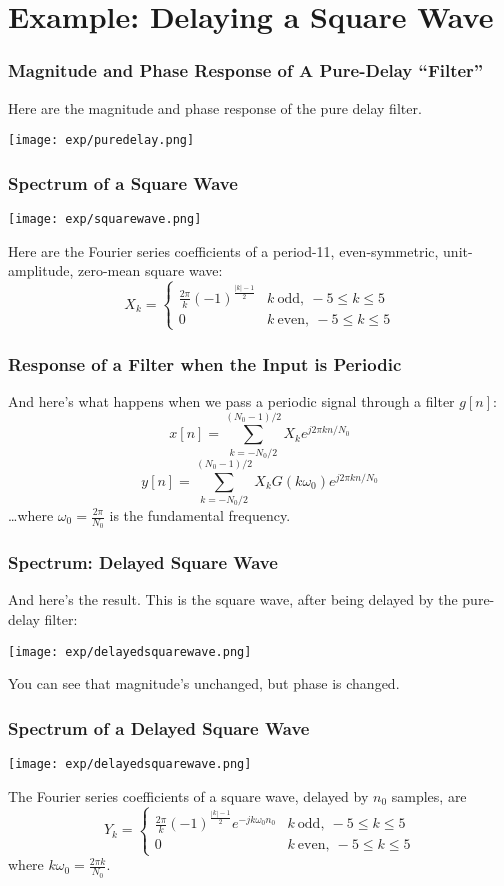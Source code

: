 \documentclass{beamer}
\begin{document}
\section[Example]{Example: Delaying a Square Wave}
\setcounter{subsection}{1}

\begin{frame}
  \frametitle{Magnitude and Phase Response of A Pure-Delay ``Filter''}
  Here are the magnitude and phase response of the pure delay filter.
\centerline{\texttt{[image: exp/puredelay.png]}}
\end{frame}

\begin{frame}
  \frametitle{Spectrum of a Square Wave}

  \centerline{\texttt{[image: exp/squarewave.png]}}

  Here are the Fourier series coefficients of a period-11,
  even-symmetric, unit-amplitude, zero-mean square wave:
  \[
  X_k = \begin{cases}
    \frac{2\pi}{k}(-1)^{\frac{|k|-1}{2}} & k~\mbox{odd},~-5\le k\le 5\\
    0 & k~\mbox{even},~-5\le k\le 5
  \end{cases}
  \]
\end{frame}

\begin{frame}
  \frametitle{Response of a Filter when the Input is Periodic}

  And here's what happens when we pass a periodic signal through a filter $g[n]$:
  \[
  x[n] =\sum_{k=-N_0/2}^{(N_0-1)/2} X_k e^{j2\pi kn/N_0}
  \]
  \[
  y[n] = \sum_{k=-N_0/2}^{(N_0-1)/2} X_k G(k\omega_0) e^{j2\pi kn/N_0}
  \]
  \ldots where $\omega_0=\frac{2\pi}{N_0}$ is the fundamental frequency.
\end{frame}

\begin{frame}
  \frametitle{Spectrum: Delayed Square Wave} And here's the result.
  This is the square wave, after being delayed by the pure-delay
  filter:
  \centerline{\texttt{[image: exp/delayedsquarewave.png]}}
  You can see that magnitude's unchanged, but phase is changed.
\end{frame}

\begin{frame}
  \frametitle{Spectrum of a Delayed Square Wave}

  \centerline{\texttt{[image: exp/delayedsquarewave.png]}}
  The Fourier series coefficients of a square wave, delayed by $n_0$
  samples, are
  \[
  Y_k = \begin{cases}
    \frac{2\pi}{k}(-1)^{\frac{|k|-1}{2}}e^{-jk\omega_0 n_0} & k~\mbox{odd},~-5\le k\le 5\\
    0 & k~\mbox{even},~-5\le k\le 5
  \end{cases}
  \]
  where $k\omega_0=\frac{2\pi k}{N_0}$.
\end{frame}
\end{document}
